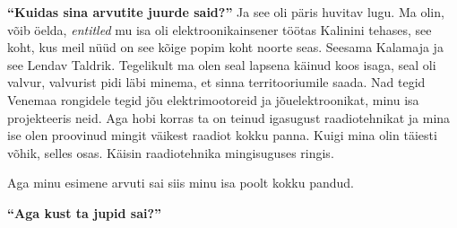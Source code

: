 
\textbf{\enquote{Kuidas sina arvutite juurde said?}}
Ja see oli päris huvitav lugu. Ma olin, võib öelda, \emph{entitled} mu isa oli elektroonikainsener töötas Kalinini tehases, see koht, kus meil nüüd on see kõige popim koht noorte seas. Seesama Kalamaja ja see Lendav Taldrik. Tegelikult ma olen seal lapsena käinud koos isaga, seal oli valvur, valvurist pidi läbi minema, et sinna territooriumile saada. Nad tegid Venemaa rongidele tegid jõu elektrimootoreid ja jõuelektroonikat, minu isa projekteeris neid. Aga hobi korras ta on teinud igasugust raadiotehnikat ja mina ise olen proovinud mingit väikest raadiot kokku panna. Kuigi mina olin täiesti võhik, selles osas. Käisin raadiotehnika mingisuguses ringis.

Aga minu esimene arvuti sai siis minu isa poolt kokku pandud.

\textbf{\enquote{Aga kust ta jupid sai?}}

